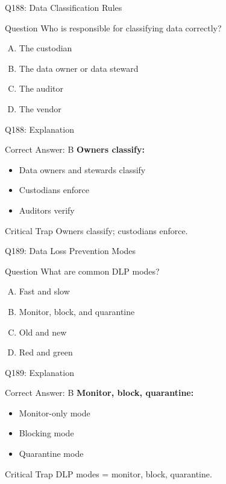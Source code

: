 \documentclass{beamer}
\begin{document}
	\begin{frame}{Q188: Data Classification Rules}
		\begin{block}{Question}
			Who is responsible for classifying data correctly?
		\end{block}
		\begin{enumerate}[(A)]
			\item The custodian
			\item The data owner or data steward
			\item The auditor
			\item The vendor
		\end{enumerate}
	\end{frame}
	
	\begin{frame}{Q188: Explanation}
		\begin{block}{Correct Answer: B}
			\textbf{Owners classify:}
			\begin{itemize}
				\item Data owners and stewards classify
				\item Custodians enforce
				\item Auditors verify
			\end{itemize}
		\end{block}
		\begin{alertblock}{Critical Trap}
			Owners classify; custodians enforce.
		\end{alertblock}
	\end{frame}
	
	\begin{frame}{Q189: Data Loss Prevention Modes}
		\begin{block}{Question}
			What are common DLP modes?
		\end{block}
		\begin{enumerate}[(A)]
			\item Fast and slow
			\item Monitor, block, and quarantine
			\item Old and new
			\item Red and green
		\end{enumerate}
	\end{frame}
	
	\begin{frame}{Q189: Explanation}
		\begin{block}{Correct Answer: B}
			\textbf{Monitor, block, quarantine:}
			\begin{itemize}
				\item Monitor-only mode
				\item Blocking mode
				\item Quarantine mode
			\end{itemize}
		\end{block}
		\begin{alertblock}{Critical Trap}
			DLP modes = monitor, block, quarantine.
		\end{alertblock}
	\end{frame}
	
\end{document}

